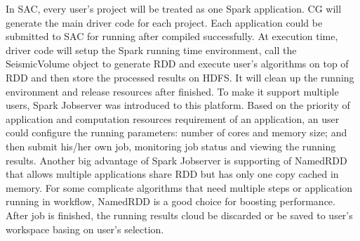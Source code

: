 In SAC, every user's project will be treated as one Spark application. CG will generate the main driver code for each project. Each application could be submitted to SAC for running after compiled successfully. At execution time, driver code will setup the Spark running time environment, call the SeismicVolume object to generate RDD and execute user's algorithms on top of RDD and then store the processed results on HDFS. It will clean up the running environment and release resources after finished. To make it support multiple users, Spark Jobserver \cite{}  was introduced to this platform. Based on the priority of application and computation resources requirement of an application, an user could configure the running parameters: number of cores and memory size; and then submit his/her own job, monitoring job status and viewing the running results. Another big advantage of Spark Jobserver is supporting of NamedRDD that allows multiple applications share RDD but has only one copy cached in memory. For some complicate algorithms that need multiple steps or application running in workflow, NamedRDD is a good choice for boosting performance. After job is finished, the running results cloud be discarded or be saved to user's workspace basing on user's selection.

